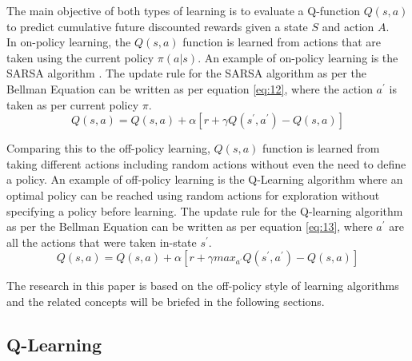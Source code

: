 The main objective of both types of learning is to evaluate a Q-function $Q(s, a)$ to predict cumulative future discounted rewards given a state $S$ and action $A$. \\ 

In on-policy learning, the $Q(s,a)$ function is learned from actions that are taken using the current policy $\pi(a|s)$. An example of on-policy learning is the SARSA algorithm \cite{zou2019finitesample}. The update rule for the SARSA algorithm as per the Bellman Equation can be written as per equation \ref{eq:12}, where the action $a^{'}$ is taken as per current policy $\pi$. \\

\begin{equation}\label{eq:12}
    Q(s, a) = Q(s, a) + \alpha [r + \gamma Q(s^{'}, a^{'}) - Q(s, a)]
\end{equation}

Comparing this to the off-policy learning, $Q(s, a)$ function is learned from taking different actions including random actions without even the need to define a policy. An example of off-policy learning is the Q-Learning algorithm \cite{QL} where an optimal policy can be reached using random actions for exploration without specifying a policy before learning. The update rule for the Q-learning algorithm as per the Bellman Equation can be written as per equation \ref{eq:13}, where $a^{'}$ are all the actions that were taken in-state $s^{'}$. \\

\begin{equation}\label{eq:13}
    Q(s, a) = Q(s, a) + \alpha [r + \gamma max_{a^{'}} Q(s^{'}, a^{'}) - Q(s, a)]
\end{equation}

The research in this paper is based on the off-policy style of learning algorithms and the related concepts will be briefed in the following sections. \\

\subsection{Q-Learning}

